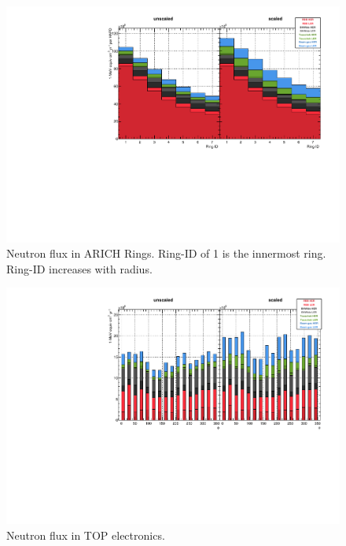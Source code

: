 \begin{figure}[htb]
	\centerfloat
		\includegraphics[width=\textwidth]{images/hARICHFlux}
	\caption[Neutron flux in ARICH rings]{Neutron flux in ARICH Rings. Ring-ID of 1 is the innermost ring. Ring-ID increases with radius.}	
	\label{fig:ARICHFlux}
\end{figure}

\begin{figure}[htb]
	\centerfloat
		\includegraphics[width=\textwidth]{images/hTOPFlux}
	\caption{Neutron flux in TOP electronics.}	
	\label{fig:TOPFlux}
\end{figure}

